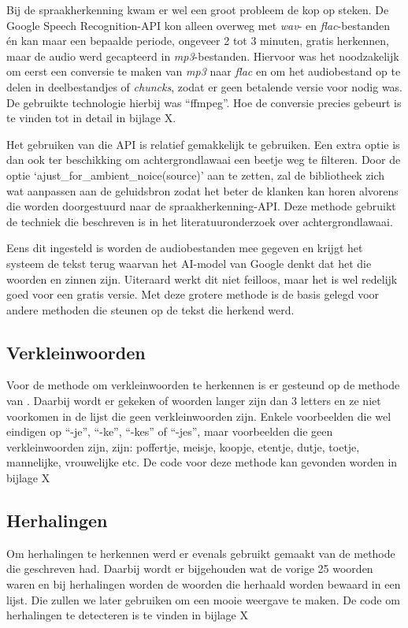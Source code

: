 Bij de spraakherkenning kwam er wel een groot probleem de kop op steken. De Google Speech Recognition-API kon alleen overweg met \textit{wav}- en \textit{flac}-bestanden én kan maar een bepaalde periode, ongeveer 2 tot 3 minuten, gratis herkennen, maar de audio werd gecapteerd in \textit{mp3}-bestanden. Hiervoor was het noodzakelijk om eerst een conversie te maken van \textit{mp3} naar \textit{flac} en om het audiobestand op te delen in deelbestandjes of \textit{chuncks}, zodat er geen betalende versie voor nodig was. De gebruikte technologie hierbij was ``ffmpeg''. Hoe de conversie precies gebeurt is te vinden tot in detail in bijlage X.

Het gebruiken van die API is relatief gemakkelijk te gebruiken. Een extra optie is dan ook ter beschikking om achtergrondlawaai een beetje weg te filteren. Door de optie `ajust\_for\_ambient\_noice(source)' aan te zetten, zal de bibliotheek zich wat aanpassen aan de geluidsbron zodat het beter de klanken kan horen alvorens die worden doorgestuurd naar de spraakherkenning-API. Deze methode gebruikt de techniek die beschreven is in het literatuuronderzoek over achtergrondlawaai.

Eens dit ingesteld is worden de audiobestanden mee gegeven en krijgt het systeem de tekst terug waarvan het AI-model van Google denkt dat het die woorden en zinnen zijn. Uiteraard werkt dit niet feilloos, maar het is wel redelijk goed voor een gratis versie. Met deze grotere methode is de basis gelegd voor andere methoden die steunen op de tekst die herkend werd.

\subsection{Verkleinwoorden}
Voor de methode om verkleinwoorden te herkennen is er gesteund op de methode van \textcite{Standaert2021}. Daarbij wordt er gekeken of woorden langer zijn dan 3 letters en ze niet voorkomen in de lijst die geen verkleinwoorden zijn. Enkele voorbeelden die wel eindigen op ``-je'', ``-ke'', ``-kes'' of ``-jes'', maar voorbeelden die geen verkleinwoorden zijn, zijn: poffertje, meisje, koopje, etentje, dutje, toetje, mannelijke, vrouwelijke etc. De code voor deze methode kan gevonden worden in bijlage X

\subsection{Herhalingen}
Om herhalingen te herkennen werd er evenals gebruikt gemaakt van de methode die \textcite{Standaert2021} geschreven had. Daarbij wordt er bijgehouden wat de vorige 25 woorden waren en bij herhalingen worden de woorden die herhaald worden bewaard in een lijst. Die zullen we later gebruiken om een mooie weergave te maken.
De code om herhalingen te detecteren is te vinden in bijlage X

